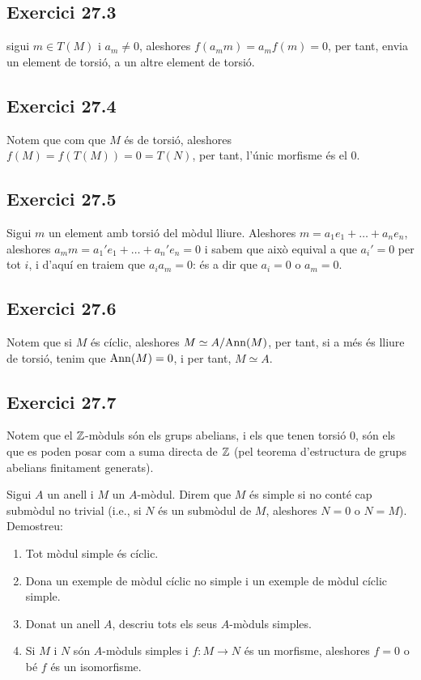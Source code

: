 \documentclass[11pt, a4paper]{article}
\begin{document}
\subsection{Exercici 27.3}
sigui $m\in T(M)$ i $a_m\neq 0$, aleshores $f(a_mm)=a_mf(m)=0$, per tant, envia un element de torsió, a un altre element de torsió. 
\subsection{Exercici 27.4}
Notem que com que $M$ és de torsió, aleshores $f(M)=f(T(M))=0=T(N)$, per tant, l'únic morfisme és el 0.
\subsection{Exercici 27.5}
Sigui $m$ un element amb torsió del mòdul lliure. Aleshores $m=a_1e_1+\dots+a_ne_n$, aleshores $a_m m=a_1'e_1+\dots+a_n'e_n=0$ i sabem que això equival a que $a_i'=0$ per tot $i$, i d'aquí en traiem que $a_i a_m=0$: és a dir que $a_i=0$ o $a_m=0$.
\subsection{Exercici 27.6}
Notem que si $M$ és cíclic, aleshores $M\simeq A/\mathrm{Ann}(M)$, per tant, si a més és lliure de torsió, tenim que $\mathrm{Ann}(M)=0$, i per tant, $M\simeq A$.
\subsection{Exercici 27.7}
Notem que el $\mathbb Z$-mòduls són els grups abelians, i els que tenen torsió 0, són els que es poden posar com a suma directa de $\mathbb Z$ (pel teorema d'estructura de grups abelians finitament generats).
\newpage
\begin{tcolorbox}[title=\section{Exercici 28}]
    Sigui $A$ un anell i $M$ un $A$-mòdul. Direm que $M$ és simple si no conté cap submòdul no trivial (i.e., si $N$ és un submòdul de $M$, aleshores $N = 0$ o $N = M$). Demostreu:
    \begin{enumerate}
        \item Tot mòdul simple és cíclic.
        \item Dona un exemple de mòdul cíclic no simple i un exemple de mòdul cíclic simple.
        \item Donat un anell $A$, descriu tots els seus $A$-mòduls simples.
        \item Si $M$ i $N$ són $A$-mòduls simples i $f : M \to N$ és un morfisme, aleshores $f = 0$ o bé $f$ és un isomorfisme.
    \end{enumerate}
\end{tcolorbox}
\end{document}

